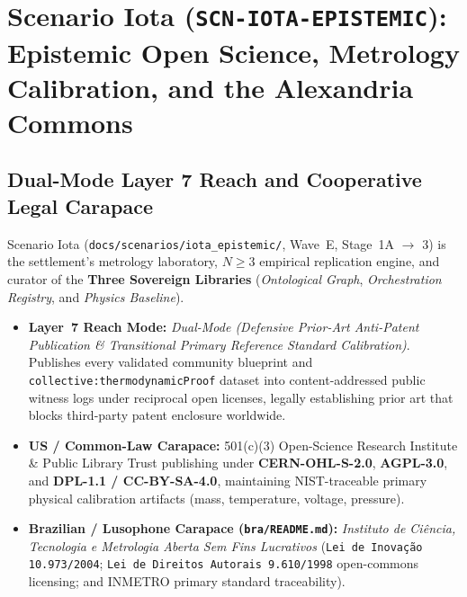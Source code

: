 \chapter{Scenario Iota (\texttt{SCN-IOTA-EPISTEMIC}): Epistemic Open Science, Metrology Calibration, and the Alexandria Commons}
\label{app:scenario-iota}

\section{Dual-Mode Layer 7 Reach and Cooperative Legal Carapace}
Scenario Iota (\texttt{docs/scenarios/iota\_epistemic/}, Wave~E, Stage~1A $\to$ 3) is the settlement's metrology laboratory, $N \ge 3$ empirical replication engine, and curator of the \textbf{Three Sovereign Libraries} (\textit{Ontological Graph}, \textit{Orchestration Registry}, and \textit{Physics Baseline}).
\begin{itemize}
    \item \textbf{Layer~7 Reach Mode:} \textit{Dual-Mode (Defensive Prior-Art Anti-Patent Publication \& Transitional Primary Reference Standard Calibration)}. Publishes every validated community blueprint and \texttt{collective:thermodynamicProof} dataset into content-addressed public witness logs under reciprocal open licenses, legally establishing prior art that blocks third-party patent enclosure worldwide.
    \item \textbf{US / Common-Law Carapace:} 501(c)(3) Open-Science Research Institute \& Public Library Trust publishing under \textbf{CERN-OHL-S-2.0}, \textbf{AGPL-3.0}, and \textbf{DPL-1.1 / CC-BY-SA-4.0}, maintaining NIST-traceable primary physical calibration artifacts (mass, temperature, voltage, pressure).
    \item \textbf{Brazilian / Lusophone Carapace (\texttt{bra/README.md}):} \textit{Instituto de Ci{\^e}ncia, Tecnologia e Metrologia Aberta Sem Fins Lucrativos} (\texttt{Lei de Inova{\c{c}}{\~a}o 10.973/2004}; \texttt{Lei de Direitos Autorais 9.610/1998} open-commons licensing; and INMETRO primary standard traceability).
\end{itemize}

